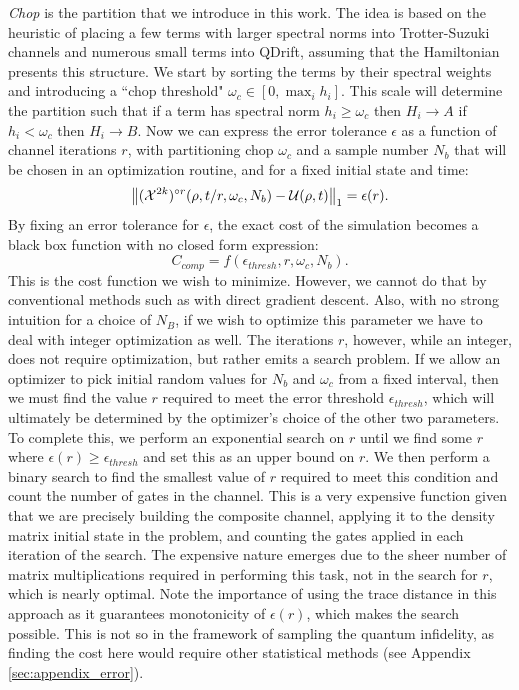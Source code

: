 \textit{Chop} is the partition that we introduce in this work. The idea is based on the heuristic of placing a few terms with larger spectral norms into Trotter-Suzuki channels and numerous small terms into QDrift, assuming that the Hamiltonian presents this structure. We start by sorting the terms by their spectral weights and introducing a ``chop threshold" $\omega_c \in [0, \max_i h_i]$. This scale will determine the partition such that if a term has spectral norm $h_i\geq\omega_c$ then $H_i\rightarrow A$ if $h_i < \omega_c$ then $H_i\rightarrow B$. Now we can express the error tolerance $\epsilon$ as a function of channel iterations $r$, with partitioning chop $\omega_c$ and a sample number $N_b$ that will be chosen in an optimization routine, and for a fixed initial state and time:
\begin{equation}\label{eq:errorfunc}
    \norm{(\mathcal{X}^{2k})^{\circ r}(\rho, t/r, \omega_c, N_b) - \mathcal{U}{ ( \rho, t ) }}_1 = \epsilon(r).
\end{equation}
%
By fixing an error tolerance for $\epsilon$, the exact cost of the simulation becomes a black box function with no closed form expression:
\begin{equation}\label{eq:cost_function}
    C_{comp} = f(\epsilon_{thresh}, r, \omega_c, N_b).
\end{equation}
This is the cost function we wish to minimize. However, we cannot do that by conventional methods such as with direct gradient descent. Also, with no strong intuition for a choice of $N_B$, if we wish to optimize this parameter we have to deal with integer optimization as well. The iterations $r$, however, while an integer, does not require optimization, but rather emits a search problem. If we allow an optimizer to pick initial random values for $N_b$ and $\omega_c$ from a fixed interval, then we must find the value $r$ required to meet the error threshold $\epsilon_{thresh}$, which will ultimately be determined by the optimizer's choice of the other two parameters. To complete this, we perform an exponential search on $r$ until we find some $r$ where $\epsilon(r) \geq \epsilon_{thresh}$ and set this as an upper bound on $r$. We then perform a binary search to find the smallest value of $r$ required to meet this condition and count the number of gates in the channel. This is a very expensive function given that we are precisely building the composite channel, applying it to the density matrix initial state in the problem, and counting the gates applied in each iteration of the search. The expensive nature emerges due to the sheer number of matrix multiplications required in performing this task, not in the search for $r$, which is nearly optimal. Note the importance of using the trace distance in this approach as it guarantees monotonicity of $\epsilon(r)$, which makes the search possible. This is not so in the framework of sampling the quantum infidelity, as finding the cost here would require other statistical methods (see Appendix \ref{sec:appendix_error}). \\


